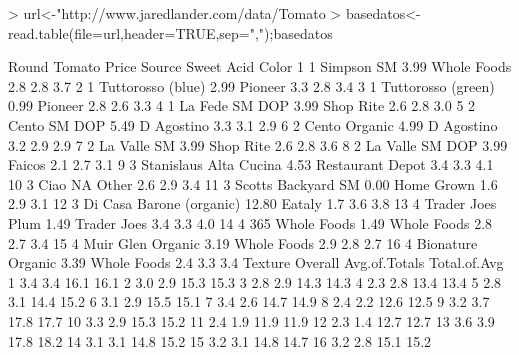 \documentclass{article}
\begin{document}
\begin{Schunk}
\begin{Sinput}
> url<-"http://www.jaredlander.com/data/Tomato%20First.csv"
> basedatos<-read.table(file=url,header=TRUE,sep=",");basedatos
\end{Sinput}
\begin{Soutput}
   Round                   Tomato Price           Source Sweet Acid Color
1      1               Simpson SM  3.99      Whole Foods   2.8  2.8   3.7
2      1        Tuttorosso (blue)  2.99          Pioneer   3.3  2.8   3.4
3      1       Tuttorosso (green)  0.99          Pioneer   2.8  2.6   3.3
4      1           La Fede SM DOP  3.99        Shop Rite   2.6  2.8   3.0
5      2             Cento SM DOP  5.49       D Agostino   3.3  3.1   2.9
6      2            Cento Organic  4.99       D Agostino   3.2  2.9   2.9
7      2              La Valle SM  3.99        Shop Rite   2.6  2.8   3.6
8      2          La Valle SM DOP  3.99           Faicos   2.1  2.7   3.1
9      3   Stanislaus Alta Cucina  4.53 Restaurant Depot   3.4  3.3   4.1
10     3                     Ciao    NA            Other   2.6  2.9   3.4
11     3       Scotts Backyard SM  0.00       Home Grown   1.6  2.9   3.1
12     3 Di Casa Barone (organic) 12.80           Eataly   1.7  3.6   3.8
13     4         Trader Joes Plum  1.49      Trader Joes   3.4  3.3   4.0
14     4          365 Whole Foods  1.49      Whole Foods   2.8  2.7   3.4
15     4        Muir Glen Organic  3.19      Whole Foods   2.9  2.8   2.7
16     4        Bionature Organic  3.39      Whole Foods   2.4  3.3   3.4
   Texture Overall Avg.of.Totals Total.of.Avg
1      3.4     3.4          16.1         16.1
2      3.0     2.9          15.3         15.3
3      2.8     2.9          14.3         14.3
4      2.3     2.8          13.4         13.4
5      2.8     3.1          14.4         15.2
6      3.1     2.9          15.5         15.1
7      3.4     2.6          14.7         14.9
8      2.4     2.2          12.6         12.5
9      3.2     3.7          17.8         17.7
10     3.3     2.9          15.3         15.2
11     2.4     1.9          11.9         11.9
12     2.3     1.4          12.7         12.7
13     3.6     3.9          17.8         18.2
14     3.1     3.1          14.8         15.2
15     3.2     3.1          14.8         14.7
16     3.2     2.8          15.1         15.2
\end{Soutput}
\begin{Soutput}

\end{Soutput}
\end{Schunk}
\end{document}
